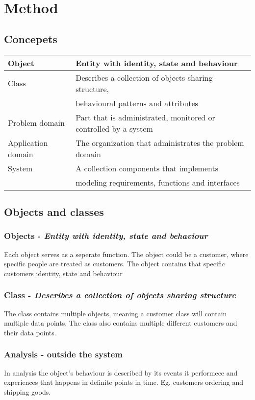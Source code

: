 \chapter{Method}
\section*{Concepets}
\begin{center}
    \begin{tabular}{ l l }
        \hline
        Object & Entity with identity, state and behaviour\\\hline
        Class  & Describes a collection of objects sharing structure, \\ & behavioural patterns and attributes\\\hline
        Problem domain & Part that is administrated, monitored or controlled by a system\\\hline
        Application domain & The organization that administrates the problem domain\\ \hline
        System & A collection components that implements \\ &  modeling requirements, functions and interfaces \\\hline
    \end{tabular}
\end{center}

\section{Objects and classes}
\subsection*{Objects - \it{Entity with identity, state and behaviour}}
Each object serves as a seperate function. The object could be a customer, where specific people are treated as customers. The object contains that specific customers identity, state and behaviour

\subsection*{Class - \it{Describes a collection of objects sharing structure}}
The class contains multiple objects, meaning a customer class will contain multiple data points. The class also contains multiple different customers and their data points.

\subsection*{Analysis - outside the system}
In analysis the object's behaviour is described by its events it performece and experiences that happens in definite points in time. Eg. customers ordering and shipping goods.\\

